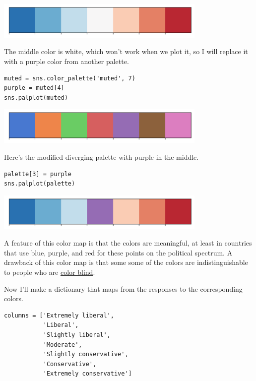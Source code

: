 \begin{center}
\includegraphics[width=4in]{chapters/02_polviews_files/02_polviews_74_0.png}
\end{center}

The middle color is white, which won't work when we plot it, so I will
replace it with a purple color from another palette.

\begin{lstlisting}[]
muted = sns.color_palette('muted', 7)
purple = muted[4]
sns.palplot(muted)
\end{lstlisting}

\begin{center}
\includegraphics[width=4in]{chapters/02_polviews_files/02_polviews_76_0.png}
\end{center}

Here's the modified diverging palette with purple in the middle.

\begin{lstlisting}[]
palette[3] = purple
sns.palplot(palette)
\end{lstlisting}

\begin{center}
\includegraphics[width=4in]{chapters/02_polviews_files/02_polviews_78_0.png}
\end{center}

A feature of this color map is that the colors are meaningful, at least
in countries that use blue, purple, and red for these points on the
political spectrum. A drawback of this color map is that some some of
the colors are indistinguishable to people who are
\href{https://davidmathlogic.com/colorblind}{color blind}.

Now I'll make a dictionary that maps from the responses to the
corresponding colors.

\begin{lstlisting}[]
columns = ['Extremely liberal', 
           'Liberal', 
           'Slightly liberal', 
           'Moderate', 
           'Slightly conservative', 
           'Conservative',
           'Extremely conservative']
\end{lstlisting}

